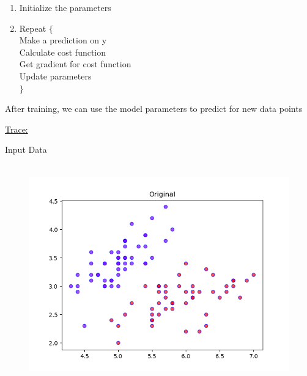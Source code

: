 \documentclass[12pt]{article}
\renewcommand{\_}{\kern-1.5pt\textunderscore\kern-1.5pt}
\begin{document}
\begin{enumerate}
	\item Initialize the parameters\par

	\item Repeat $ \{ $ \\
 \tab Make a prediction on y\\
 \tab Calculate cost function\\
 \tab Get gradient for cost function\\
 \tab Update parameters\\
$ \} $ 
\end{enumerate}\par

\textcolor[HTML]{202122}{After training, we can use the model parameters to predict for new data points}\par

{\fontsize{14pt}{16.8pt}\selectfont \textcolor[HTML]{202122}{\uline{Trace:}}\par}\par

\textcolor[HTML]{202122}{Input Data}\par




\begin{figure}[H]
	\begin{Center}
		\includegraphics[width=4.96in,height=3.73in]{./media/image38.png}
	\end{Center}
\end{figure}
\end{document}
